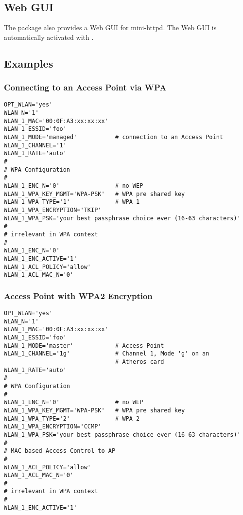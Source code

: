 \subsection {Web GUI}

    The package also provides a Web GUI for mini-httpd.
    The Web GUI is automatically activated with .
    
\subsection{Examples}
\subsubsection{Connecting to an Access Point via WPA}

\begin{example}
\begin{verbatim}
OPT_WLAN='yes'
WLAN_N='1'
WLAN_1_MAC='00:0F:A3:xx:xx:xx'
WLAN_1_ESSID='foo'
WLAN_1_MODE='managed'           # connection to an Access Point
WLAN_1_CHANNEL='1'
WLAN_1_RATE='auto'
#
# WPA Configuration
#
WLAN_1_ENC_N='0'                # no WEP
WLAN_1_WPA_KEY_MGMT='WPA-PSK'   # WPA pre shared key
WLAN_1_WPA_TYPE='1'             # WPA 1
WLAN_1_WPA_ENCRYPTION='TKIP'
WLAN_1_WPA_PSK='your best passphrase choice ever (16-63 characters)'
#
# irrelevant in WPA context
#
WLAN_1_ENC_N='0'
WLAN_1_ENC_ACTIVE='1'
WLAN_1_ACL_POLICY='allow'
WLAN_1_ACL_MAC_N='0'
\end{verbatim}
\end{example}

\subsubsection{Access Point with WPA2 Encryption}

\begin{example}
\begin{verbatim}
OPT_WLAN='yes'
WLAN_N='1'
WLAN_1_MAC='00:0F:A3:xx:xx:xx'
WLAN_1_ESSID='foo'
WLAN_1_MODE='master'            # Access Point
WLAN_1_CHANNEL='1g'             # Channel 1, Mode 'g' on an
                                # Atheros card
WLAN_1_RATE='auto'
#
# WPA Configuration
#
WLAN_1_ENC_N='0'                # no WEP
WLAN_1_WPA_KEY_MGMT='WPA-PSK'   # WPA pre shared key
WLAN_1_WPA_TYPE='2'             # WPA 2
WLAN_1_WPA_ENCRYPTION='CCMP'
WLAN_1_WPA_PSK='your best passphrase choice ever (16-63 characters)'
#
# MAC based Access Control to AP
#
WLAN_1_ACL_POLICY='allow'
WLAN_1_ACL_MAC_N='0'
#
# irrelevant in WPA context
#
WLAN_1_ENC_ACTIVE='1'
\end{verbatim}
\end{example}

